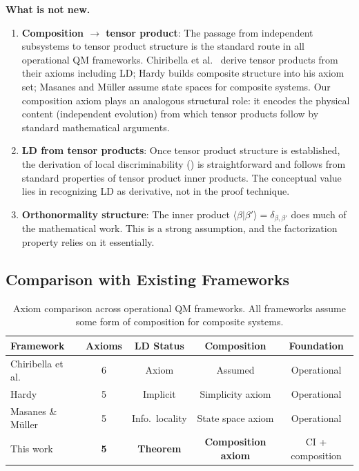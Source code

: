 \documentclass[11pt,a4paper]{article}
\theoremstyle{definition}
\theoremstyle{remark}
\newcommand{\braket}[2]{\langle#1|#2\rangle}
\begin{document}
\textbf{What is not new.}
\begin{enumerate}
\item \textbf{Composition $\to$ tensor product}: The passage from
  independent subsystems to tensor product structure is the standard
  route in all operational QM frameworks. Chiribella et al.\
  \cite{chiribella2011informational} derive tensor products from their
  axioms including LD; Hardy \cite{hardy2001quantum} builds composite
  structure into his axiom set; Masanes and M\"uller
  \cite{masanes2011general} assume state spaces for composite systems.
  Our composition axiom plays an analogous structural role: it
  encodes the physical content (independent evolution) from which
  tensor products follow by standard mathematical arguments.
\item \textbf{LD from tensor products}: Once tensor product structure is
  established, the derivation of local discriminability
  () is straightforward and follows from
  standard properties of tensor product inner products. The conceptual
  value lies in recognizing LD as derivative, not in the proof
  technique.
\item \textbf{Orthonormality structure}: The inner product
  $\braket{\beta}{\beta'} = \delta_{\beta,\beta'}$ does much of the
  mathematical work. This is a strong assumption, and the factorization
  property relies on it essentially.
\end{enumerate}

\subsection{Comparison with Existing Frameworks}

\begin{table}[htbp]
\centering
\caption{Axiom comparison across operational QM frameworks. All
  frameworks assume some form of composition for composite systems.}
\label{tab:axiom_comparison}
\begin{tabular}{@{}lcccc@{}}
\toprule
\textbf{Framework} & \textbf{Axioms} & \textbf{LD Status} &
  \textbf{Composition} & \textbf{Foundation} \\
\midrule
Chiribella et al.\ \cite{chiribella2011informational} & 6 & Axiom &
  Assumed & Operational \\
Hardy \cite{hardy2001quantum} & 5 & Implicit & Simplicity axiom &
  Operational \\
Masanes \& M\"uller \cite{masanes2011general} & 5 & Info.\ locality &
  State space axiom & Operational \\
This work & \textbf{5} & \textbf{Theorem} & \textbf{Composition axiom} &
  CI + composition \\
\bottomrule
\end{tabular}
\end{table}
\end{document}
